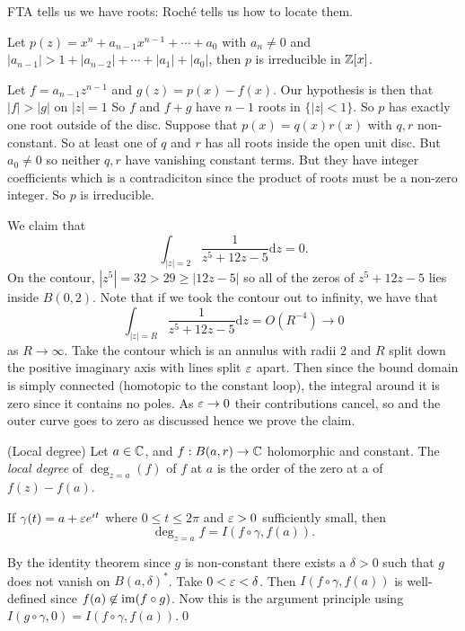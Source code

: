 \documentclass{article}
\begin{document}
\begin{remark}
  FTA tells us we have roots: Roch\'e tells us how to locate them.
\end{remark}
\begin{example}
	Let $ p(z) = x^n + a_{n-1}x^{n-1} + \cdots + a_0 $ with $ a_n \ne 0 $ and $ |a_{n-1}| > 1 + |a_{n-2}| + \cdots + |a_1| + |a_0| $, then $ p $ is irreducible in $ \mathbb{Z}[x] $.\par
	Let $ f= a_{n-1}z^{n-1} $ and $ g(z) = p(x) - f(x) $. Our hypothesis is then that $ |f| > |g| $ on $ |z|=1 $ So $ f $ and $ f+g $ have $ n-1 $ roots in $ \{|z| <1 \} $. So $ p $ has exactly one root outside of the disc. Suppose that $ p(x)=q(x)r(x) $ with $ q,r $ non-constant. So at least one of $ q $ and $ r $ has all roots inside the open unit disc. But $ a_0 \ne 0 $ so neither $ q,r $ have vanishing constant terms. But they have integer coefficients which is a contradiciton since the product of roots must be a non-zero integer. So $ p $ is irreducible.
\end{example}
\begin{example}
  We claim that
  \[
	  \int_{|z|=2} \frac 1{z^5+12z-5}\mathrm dz = 0.
  \]
  On the contour, $ |z^5| = 32 > 29 \ge |12z-5| $ so all of the zeros of $ z^5 + 12z-5 $ lies inside $ B(0,2) $. Note that if we took the contour out to infinity, we have that
  \[
	  \int_{|z|=R}\frac 1{z^5+12z-5}\mathrm dz = O(R^{-4}) \to 0
  \]
  as $ R\to\infty $. Take the contour which is an annulus with radii $ 2 $ and $ R $ split down the positive imaginary axis with lines split $ \varepsilon $ apart. Then since the bound domain is simply connected (homotopic to the constant loop), the integral around it is zero since it contains no poles. As $ \varepsilon\to 0 $ their contributions cancel, so and the outer curve goes to zero as discussed hence we prove the claim.
\end{example}
\begin{definition}
	(Local degree) Let $ a\in \mathbb{C} $, and $ f:B(a,r)\to\mathbb{C} $ holomorphic and constant. The \textit{local degree} of $ \deg_{z=a}(f) $ of $ f $ at $ a $ is the order of the zero at a of $ f(z)-f(a) $.
\end{definition} 
\begin{lemma}
	If $ \gamma(t) = a+\varepsilon e^{it} $ where $ 0\le t \le 2\pi $ and $ \varepsilon>0 $ sufficiently small, then
	\[
		\deg_{z=a}f = I(f\circ \gamma,f(a)).
	\]
\end{lemma}
\pf By the identity theorem since $ g $ is non-constant there exists a $ \delta>0 $ such that $ g $ does not vanish on $ B(a,\delta)^* $. Take $ 0<\varepsilon<\delta $. Then $ I(f\circ\gamma,f(a)) $ is well-defined since $ f(a)\not\in \operatorname{im}(f\circ g) $. Now this is the argument principle using $ I(g\circ\gamma,0) = I(f\circ\gamma, f(a)) $.\qed
\end{document}
